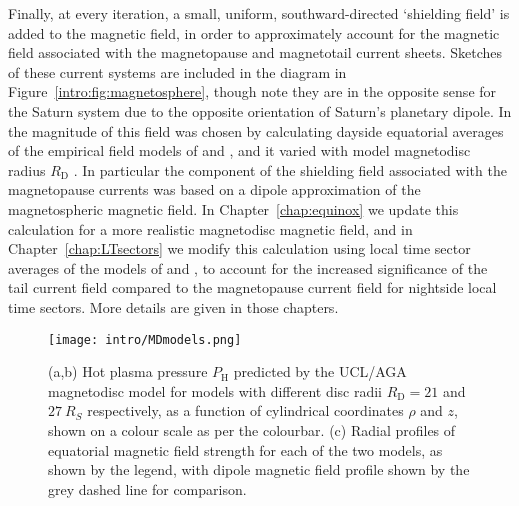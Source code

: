 Finally, at every iteration, a small, uniform, southward-directed `shielding field' is added to the magnetic field, in order to approximately account for the magnetic field associated with the magnetopause and magnetotail current sheets. Sketches of these current systems are included in the diagram in Figure~\ref{intro:fig:magnetosphere}, though note they are in the opposite sense for the Saturn system due to the opposite orientation of Saturn's planetary dipole. In \citet{achilleos2010a} the magnitude of this field was chosen by calculating dayside equatorial averages of the empirical field models of \citet{alexeev2005} and \citet{alexeev2006}, and it varied with model magnetodisc radius $R_\mathrm{D}$ \citep[see][Figure 6]{achilleos2010a}. In particular the component of the shielding field associated with the magnetopause currents was based on a dipole approximation of the magnetospheric magnetic field. In Chapter~\ref{chap:equinox} we update this calculation for a more realistic magnetodisc magnetic field, and in Chapter~\ref{chap:LTsectors} we modify this calculation using local time sector averages of the models of \citet{alexeev2005} and \citet{alexeev2006}, to account for the increased significance of the tail current field compared to the magnetopause current field for nightside local time sectors. More details are given in those chapters. 

\begin{figure}
\centering
\texttt{[image: intro/MDmodels.png]}
\caption[Magnetic field structure for $R_\mathrm{D}={21}$ and $\SI{27}{R_S}$ UCL/AGA magnetodisc models.]{(a,b) Hot plasma pressure $P_\mathrm{H}$ predicted by the UCL/AGA magnetodisc model for models with different disc radii $R_\mathrm{D}={21}$ and $\SI{27}{R_S}$ respectively, as a function of cylindrical coordinates $\rho$ and $z$, shown on a colour scale as per the colourbar. (c) Radial profiles of equatorial magnetic field strength for each of the two models, as shown by the legend, with dipole magnetic field profile shown by the grey dashed line for comparison.}
\label{intro:fig:MDmodels}
\end{figure}

